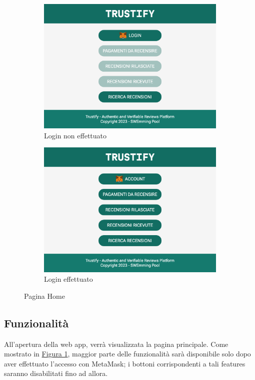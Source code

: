 \begin{figure}[H]
    \centering
    \begin{subfigure}[t]{0.49\textwidth}
    \centering
    \includegraphics[width=0.9\linewidth]{src/img/home.png}
    \caption{Login non effettuato}\label{fig:home_nologin}
    \end{subfigure}
    \centering
    \begin{subfigure}[t]{0.49\textwidth}
    \centering
    \includegraphics[width=0.9\linewidth]{src/img/home_login.png}
    \caption{Login effettuato}\label{fig:home_login}
    \end{subfigure}

    \caption{Pagina Home}\label{fig:home}
\end{figure}
\subsection{Funzionalità}
All'apertura della web app, verrà visualizzata la pagina principale. Come mostrato in \hyperref[fig:home]{Figura 1}, maggior parte delle funzionalità sarà disponibile solo dopo aver effettuato l'accesso con MetaMask; i bottoni corrispondenti a tali features saranno disabilitati fino ad allora.

